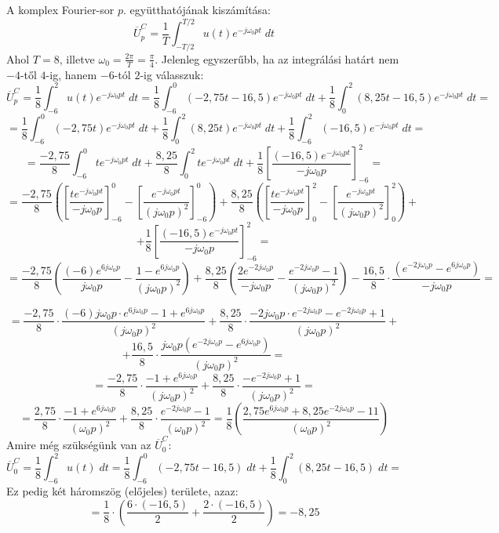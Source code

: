 \documentclass[12pt,a4paper]{article}
\begin{document}
A komplex Fourier-sor $p$. együtthatójának kiszámítása:
\[\overline{U}^C_p = \frac{1}{T}\int_{-T/2}^{T/2} u(t) e^{-j\omega_0 p t} \; dt\]
Ahol $T=8$, illetve $\omega_0 = \frac{2\pi}{T} = \frac{\pi}{4}$. Jelenleg egyszerűbb, ha az integrálási határt nem $-4$-től $4$-ig, hanem $-6$-tól $2$-ig válasszuk:
\[\overline{U}^C_p = \frac{1}{8}\int_{-6}^{2} u(t) e^{-j\omega_0 p t} \; dt = \frac{1}{8}\int_{-6}^{0} (-2,75t-16,5) e^{-j\omega_0 p t} \; dt + \frac{1}{8}\int_{0}^{2} (8,25t-16,5) e^{-j\omega_0 p t} \; dt =\]
\[= \frac{1}{8}\int_{-6}^{0} (-2,75t) e^{-j\omega_0 p t} \; dt + \frac{1}{8}\int_{0}^{2} (8,25t) e^{-j\omega_0 p t} \; dt + \frac{1}{8}\int_{-6}^{2} (-16,5) e^{-j\omega_0 p t} \; dt = \]
\[= \frac{-2,75}{8}\int_{-6}^{0} t e^{-j\omega_0 p t} \; dt + \frac{8,25}{8}\int_{0}^{2} t e^{-j\omega_0 p t} \; dt + \frac{1}{8}\left[\frac{(-16,5) e^{-j\omega_0 p t}}{-j\omega_0 p }\right]_{-6}^{2} = \]
\[= \frac{-2,75}{8}\left(\left[\frac{t e^{-j\omega_0 p t}}{-j\omega_0 p}\right]_{-6}^{0} - \left[ \frac{e^{-j\omega_0 p t}}{(j\omega_0 p)^2} \right]_{-6}^{0} \right) + \frac{8,25}{8}\left(\left[\frac{t e^{-j\omega_0 p t}}{-j\omega_0 p}\right]_{0}^{2} - \left[ \frac{e^{-j\omega_0 p t}}{(j\omega_0 p)^2} \right]_{0}^{2} \right) + \]
\[ + \frac{1}{8}\left[\frac{(-16,5) e^{-j\omega_0 p t}}{-j\omega_0 p }\right]_{-6}^{2} = \]
\[= \frac{-2,75}{8}\left(\frac{(-6) e^{6j\omega_0 p }}{j\omega_0 p} - \frac{1-e^{6j\omega_0 p}}{(j\omega_0 p)^2} \right) + \frac{8,25}{8}\left( \frac{2 e^{-2j\omega_0 p}}{-j\omega_0 p} - \frac{e^{-2j\omega_0 p}-1}{(j\omega_0 p)^2} \right) - \frac{16,5}{8}\cdot\frac{ (e^{-2j\omega_0 p}-e^{6j\omega_0 p})}{-j\omega_0 p } = \]

\[= \frac{-2,75}{8}\cdot\frac{(-6)j\omega_0 p\cdot e^{6j\omega_0 p }-1+e^{6j\omega_0 p}}{(j\omega_0 p)^2} + \frac{8,25}{8}\cdot \frac{-2j\omega_0 p\cdot e^{-2j\omega_0 p}-e^{-2j\omega_0 p}+1}{(j\omega_0 p)^2} +\]
\[+ \frac{16,5}{8}\cdot\frac{j\omega_0 p(e^{-2j\omega_0 p}-e^{6j\omega_0 p})}{(j\omega_0 p)^2 } = \]
\[ = \frac{-2,75}{8}\cdot\frac{-1+e^{6j\omega_0 p}}{(j\omega_0 p)^2} + \frac{8,25}{8}\cdot \frac{-e^{-2j\omega_0 p}+1}{(j\omega_0 p)^2} =\]
\[= \frac{2,75}{8}\cdot\frac{-1+e^{6j\omega_0 p}}{(\omega_0 p)^2} + \frac{8,25}{8}\cdot \frac{e^{-2j\omega_0 p}-1}{(\omega_0 p)^2} = \boxed{\frac{1}{8}\left(\frac{2,75e^{6j\omega_0 p}+8,25e^{-2j\omega_0 p}-11}{(\omega_0 p)^2}\right)}\]
Amire még szükségünk van az $\overline{U}^C_0$:
\[\overline{U}^C_0 = \frac{1}{8}\int_{-6}^{2} u(t) \; dt = \frac{1}{8}\int_{-6}^{0} (-2,75t-16,5) \; dt + \frac{1}{8}\int_{0}^{2} (8,25t-16,5) \; dt = \]
Ez pedig két háromszög (előjeles) területe, azaz:
\[= \frac{1}{8}\cdot\left(\frac{6\cdot (-16,5)}{2}+\frac{2\cdot (-16,5)}{2}\right) = -8,25\]
\end{document}
